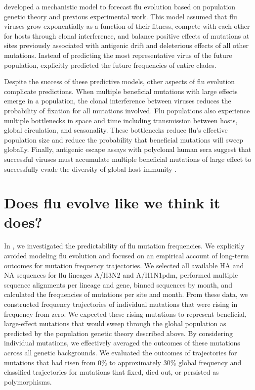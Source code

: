 \citet{Luksza:2014hj} developed a mechanistic model to forecast flu evolution based on population genetic theory and previous experimental work.
This model assumed that flu viruses grow exponentially as a function of their fitness, compete with each other for hosts through clonal interference, and balance positive effects of mutations at sites previously associated with antigenic drift and deleterious effects of all other mutations.
Instead of predicting the most representative virus of the future population, \citet{Luksza:2014hj} explicitly predicted the future frequencies of entire clades.

Despite the success of these predictive models, other aspects of flu evolution complicate predictions.
When multiple beneficial mutations with large effects emerge in a population, the clonal interference between viruses reduces the probability of fixation for all mutations involved.
Flu populations also experience multiple bottlenecks in space and time including transmission between hosts, global circulation, and seasonality.
These bottlenecks reduce flu's effective population size and reduce the probability that beneficial mutations will sweep globally.
Finally, antigenic escape assays with polyclonal human sera suggest that successful viruses must accumulate multiple beneficial mutations of large effect to successfully evade the diversity of global host immunity \citep{Lee2019}.

\section{Does flu evolve like we think it does?}

In \citet{Barrat-Charlaix2020}, we investigated the predictability of flu mutation frequencies.
We explicitly avoided modeling flu evolution and focused on an empirical account of long-term outcomes for mutation frequency trajectories.
We selected all available HA and NA sequences for flu lineages A/H3N2 and A/H1N1pdm, performed multiple sequence alignments per lineage and gene, binned sequences by month, and calculated the frequencies of mutations per site and month.
From these data, we constructed frequency trajectories of individual mutations that were rising in frequency from zero.
We expected these rising mutations to represent beneficial, large-effect mutations that would sweep through the global population as predicted by the population genetic theory described above.
By considering individual mutations, we effectively averaged the outcomes of these mutations across all genetic backgrounds.
We evaluated the outcomes of trajectories for mutations that had risen from 0\% to approximately 30\% global frequency and classified trajectories for mutations that fixed, died out, or persisted as polymorphisms.


